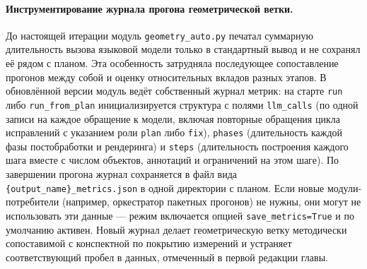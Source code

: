 \paragraph{Инструментирование журнала прогона геометрической ветки.} До настоящей итерации модуль \texttt{geometry\_auto.py} печатал суммарную длительность вызова языковой модели только в стандартный вывод и не сохранял её рядом с планом. Эта особенность затрудняла последующее сопоставление прогонов между собой и оценку относительных вкладов разных этапов. В обновлённой версии модуль ведёт собственный журнал метрик: на старте \texttt{run} либо \texttt{run\_from\_plan} инициализируется структура с полями \texttt{llm\_calls} (по одной записи на каждое обращение к модели, включая повторные обращения цикла исправлений с указанием роли \texttt{plan} либо \texttt{fix}), \texttt{phases} (длительность каждой фазы постобработки и рендеринга) и \texttt{steps} (длительность построения каждого шага вместе с числом объектов, аннотаций и ограничений на этом шаге). По завершении прогона журнал сохраняется в файл вида \texttt{\{output\_name\}\_metrics.json} в одной директории с планом. Если новые модули\nobreakdash-потребители (например, оркестратор пакетных прогонов) не нужны, они могут не использовать эти данные --- режим включается опцией \texttt{save\_metrics=True} и по умолчанию активен. Новый журнал делает геометрическую ветку методически сопоставимой с конспектной по покрытию измерений и устраняет соответствующий пробел в данных, отмеченный в первой редакции главы.

